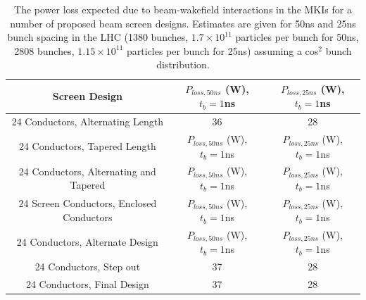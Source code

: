\begin{table}
\label{tab:heating-mki-screen-designs}
\caption{The power loss expected due to beam-wakefield interactions in the MKIs for a number of proposed beam screen designs. Estimates are given for 50ns and 25ns bunch spacing in the LHC (1380 bunches, $1.7 \times 10^{11}$ particles per bunch for 50ns, 2808 bunches, $1.15 \times 10^{11}$ particles per bunch for 25ns) assuming a cos$^{2}$ bunch distribution.}
\begin{center}
\begin{tabular}{c | c | c}
Screen Design & $P_{loss,50ns}$ (W), $t_{b}=1$ns & $P_{loss,25ns}$ (W), $t_{b}=1$ns \\ \hline 
24 Conductors, Alternating Length & 36 & 28 \\ \hline %
24 Conductors, Tapered Length & $P_{loss,50ns}$ (W), $t_{b}=1$ns & $P_{loss,25ns}$ (W), $t_{b}=1$ns \\ \hline %
24 Conductors, Alternating and Tapered & $P_{loss,50ns}$ (W), $t_{b}=1$ns & $P_{loss,25ns}$ (W), $t_{b}=1$ns \\ \hline %
24 Screen Conductors, Enclosed Conductors & $P_{loss,50ns}$ (W), $t_{b}=1$ns & $P_{loss,25ns}$ (W), $t_{b}=1$ns \\ \hline %
24 Conductors, Alternate Design & $P_{loss,50ns}$ (W), $t_{b}=1$ns & $P_{loss,25ns}$ (W), $t_{b}=1$ns \\ \hline %
24 Conductors, Step out & 37 & 28 \\ \hline %
24 Conductors, Final Design & 37 & 28 \\ %
\end{tabular}
\end{center}
\end{table}

